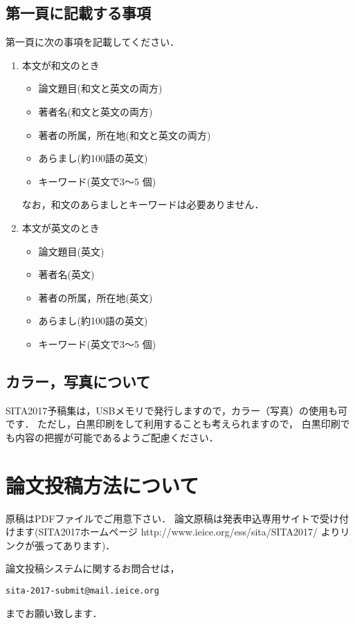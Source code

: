 \documentclass{jarticle}
\begin{document}
\subsection{第一頁に記載する事項}

第一頁に次の事項を記載してください．

\begin{enumerate}
 \item 本文が和文のとき
       \begin{itemize}
	\item 論文題目(和文と英文の両方)
	\item 著者名(和文と英文の両方)
	\item 著者の所属，所在地(和文と英文の両方)
	\item あらまし(約100語の英文)
	\item キーワード(英文で3～5 個)
       \end{itemize}
       なお，和文のあらましとキーワードは必要ありません．
 \item 本文が英文のとき
       \begin{itemize}
	\item 論文題目(英文)
	\item 著者名(英文)
	\item 著者の所属，所在地(英文)
	\item あらまし(約100語の英文)
	\item キーワード(英文で3～5 個)
       \end{itemize}
\end{enumerate}


\subsection{カラー，写真について}

SITA2017予稿集は，USBメモリで発行しますので，カラー（写真）の使用も可です．
ただし，白黒印刷をして利用することも考えられますので，
白黒印刷でも内容の把握が可能であるようご配慮ください．


\section{論文投稿方法について}

原稿はPDFファイルでご用意下さい．
論文原稿は発表申込専用サイトで受け付けます(SITA2017ホームページ
http://www.ieice.org/ess/sita/SITA2017/
よりリンクが張ってあります)．

論文投稿システムに関するお問合せは，
\begin{center}
\tt sita-2017-submit@mail.ieice.org
\end{center}
までお願い致します．
\end{document}
